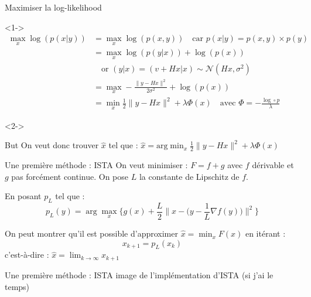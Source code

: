 \documentclass[11pt]{beamer}
\begin{document}
\begin{frame}{Maximiser la log-likelihood}
    \begin{visibleenv}<1->
        \begin{align*}
            \max_x \log(p(x|y)) &= \max_x \log(p(x, y)) \quad \text{car } p(x|y) = p(x, y) \times p(y) \\
            &= \max_x \log(p(y|x)) + \log(p(x)) \\
            &\quad \text{or } (y|x) = (v+Hx|x) \sim \mathcal{N}(Hx, \sigma^2) \\
            &= \max_x -\frac{\lVert y-Hx \rVert ^2}{2 \sigma^2} + \log(p(x)) \\
            &= \min_x \frac{1}{2}\lVert y-Hx \rVert ^2 + \lambda \Phi(x) \quad \text{avec } \Phi = -\frac{\log \circ p}{\lambda}
        \end{align*}
    \end{visibleenv}

    \begin{visibleenv}<2->
        \begin{alertblock}{But}
            On veut donc trouver $\hat{x}$ tel que : $\hat{x} = \text{arg} \displaystyle \min_x \frac{1}{2} \lVert y-Hx \rVert ^2 + \lambda \Phi(x)$
        \end{alertblock}
    \end{visibleenv}
\end{frame}

\begin{frame}{Une première méthode : ISTA}
    On veut minimiser : $F = f + g$ avec $f$ dérivable et $g$ pas forcément continue.
    On pose $L$ la constante de Lipschitz de $f$.

    En posant $p_L$ tel que : $$ p_L(y) = \arg \max_x \Bigg\{ g(x) + \frac{L}{2} \Big\lVert x - \Big(y - \frac{1}{L} \nabla f(y)\Big) \Big\rVert ^2 \Bigg\}$$

    On peut montrer qu'il est possible d'approximer $\hat{x} = \displaystyle \min_x F(x)$ en itérant :
    $$x_{k+1} = p_L(x_k)$$
    c'est-à-dire : $\hat{x} = \displaystyle \lim_{k \rightarrow \infty} x_{k+1}$

\end{frame}

\begin{frame}{Une première méthode : ISTA}
    image de l'implémentation d'ISTA (si j'ai le temps)
\end{frame}
\end{document}
